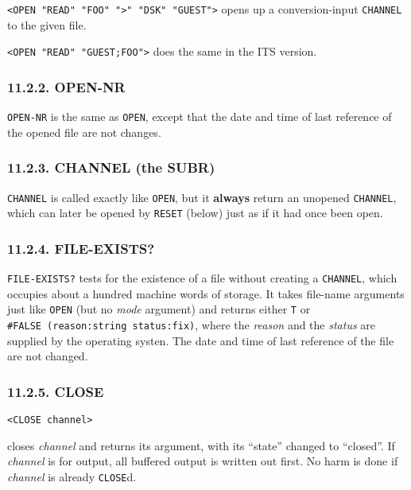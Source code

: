 \documentclass[a4paper,]{article}
\begin{document}
\texttt{\textless{}OPEN\ "READ"\ "FOO"\ "\textgreater{}"\ "DSK"\ "GUEST"\textgreater{}} opens up a conversion-input
\texttt{CHANNEL} to the given file.

\texttt{\textless{}OPEN\ "READ"\ "GUEST;FOO"\textgreater{}} does the same in the ITS version.

\subsubsection{11.2.2. OPEN-NR}\label{open-nr}

\texttt{OPEN-NR}  is the same as \texttt{OPEN}, except that the date and time of last
reference of the opened file are not changes.

\subsubsection{11.2.3. CHANNEL (the SUBR)}\label{channel-the-subr}

\texttt{CHANNEL}  is called exactly like \texttt{OPEN}, but it \textbf{always} return an
unopened \texttt{CHANNEL}, which can later be opened by \texttt{RESET}  (below) just as if it had
once been open.

\subsubsection{11.2.4. FILE-EXISTS?}\label{file-exists}

\texttt{FILE-EXISTS?}  tests for the existence of a file without creating a
\texttt{CHANNEL}, which occupies about a hundred machine words of storage. It takes file-name arguments just like
\texttt{OPEN} (but no \emph{mode} argument) and returns either \texttt{T} or \texttt{\#FALSE\ (reason:string\ status:fix)},
where the \emph{reason} and the \emph{status} are supplied by the operating systen. The date and time of last reference of
the file are not changed.

\subsubsection{11.2.5. CLOSE}\label{close}

\begin{verbatim}
<CLOSE channel>
\end{verbatim}

 closes \emph{channel} and returns its argument, with its ``state'' changed to ``closed''. If
\emph{channel} is for output, all buffered output is written out first. No harm is done if \emph{channel} is already
\texttt{CLOSE}d.
\end{document}
